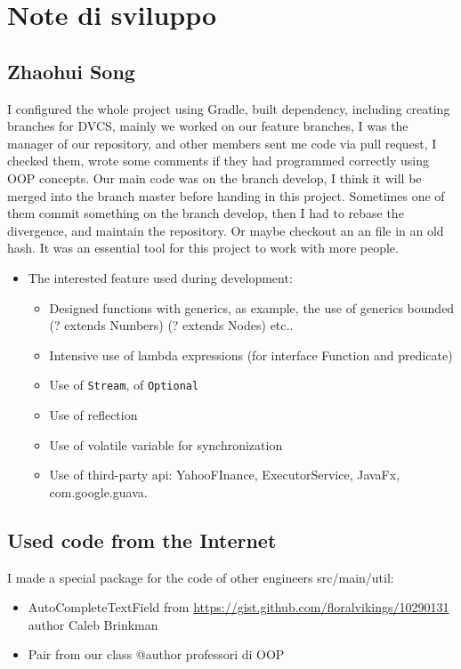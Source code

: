 \documentclass[a4paper,12pt]{report}
\begin{document}
\section{Note di sviluppo}

\subsection{Zhaohui Song}
I configured the whole project using Gradle, built dependency, including creating branches for DVCS, 
%
mainly we worked on our feature branches, I was the manager of our repository, and other members sent me code via pull request, I checked them, wrote some comments if they had programmed correctly using OOP concepts. 
%
Our main code was on the branch develop, I think it will be merged into the branch master before handing in this project.
%
Sometimes one of them commit something on the branch develop, then I had to rebase the divergence, and maintain the repository. Or maybe checkout an an file in an old hash. It was an essential tool for this project to work with more people. 

\begin{itemize}
	\item The interested feature used during development:
	\begin{itemize}
		\item Designed functions with generics, as example, the use of generics bounded (? extends Numbers) (? extends Nodes) etc..
		\item Intensive use of lambda expressions (for interface Function and predicate)
		\item Use of \texttt{Stream}, of \texttt{Optional} 
		\item Use of reflection
		\item Use of volatile variable for synchronization
		\item Use of third-party api: YahooFInance, ExecutorService, JavaFx, com.google.guava.
	\end{itemize}
\end{itemize}

\subsection*{Used code from the Internet}

I made a special package for the code of other engineers src/main/util:
\begin{itemize}
	\item AutoCompleteTextField from \url{https://gist.github.com/floralvikings/10290131} author Caleb Brinkman
	\item Pair from our class @author professori di OOP 
\end{itemize}
\end{document}
